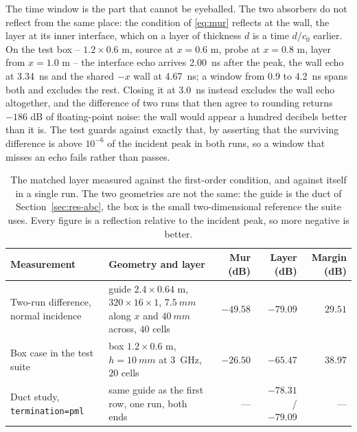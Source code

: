 The time window is the part that cannot be eyeballed. The two absorbers do not reflect from the same place:
the condition of \eqref{eq:mur} reflects at the wall, the layer at its inner interface, which on a layer of
thickness $d$ is a time $d/c_0$ earlier. On the test box -- $1.2\times0.6$ m, source at $x=0.6$ m, probe at
$x=0.8$ m, layer from $x=1.0$ m -- the interface echo arrives \SI{2.00}{\nano\second} after the peak, the wall
echo at \SI{3.34}{\nano\second} and the shared $-x$ wall at \SI{4.67}{\nano\second}; a window from
\SI{0.9}{} to \SI{4.2}{\nano\second} spans both and excludes the rest. Closing it at \SI{3.0}{\nano\second}
instead excludes the wall echo altogether, and the difference of two runs that then agree to rounding returns
$-186$ dB of floating-point noise: the wall would appear a hundred decibels better than it is. The test guards
against exactly that, by asserting that the surviving difference is above $10^{-6}$ of the incident peak in
both runs, so a window that misses an echo fails rather than passes.

\begin{table}[H]
  \centering
  \caption{The matched layer measured against the first-order condition, and against itself in a single run.
  The two geometries are not the same: the guide is the duct of Section~\ref{sec:res-abc}, the box is the small
  two-dimensional reference the suite uses. Every figure is a reflection relative to the incident peak, so more
  negative is better.}
  \label{tab:pml}
  \small
  \setlength{\tabcolsep}{4.5pt}
  \begin{tabular}{@{}l p{3.0cm} r r r@{}}
    \toprule
    Measurement & Geometry and layer & Mur (dB) & Layer (dB) & Margin (dB) \\
    \midrule
    Two-run difference, normal incidence & guide $2.4\times0.64$ m, $320\times16\times1$, $\SI{7.5}{mm}$
      along $x$ and $\SI{40}{mm}$ across, $40$ cells
      & $-49.58$ & $-79.09$ & $29.51$ \\
    Box case in the test suite & box $1.2\times0.6$ m, $h=\SI{10}{mm}$ at \SI{3}{\giga\hertz}, $20$ cells
      & $-26.50$ & $-65.47$ & $38.97$ \\
    Duct study, \texttt{termination=pml} & same guide as the first row, one run, both ends
      & --- & $-78.31$ / $-79.09$ & --- \\
    \bottomrule
  \end{tabular}
\end{table}

